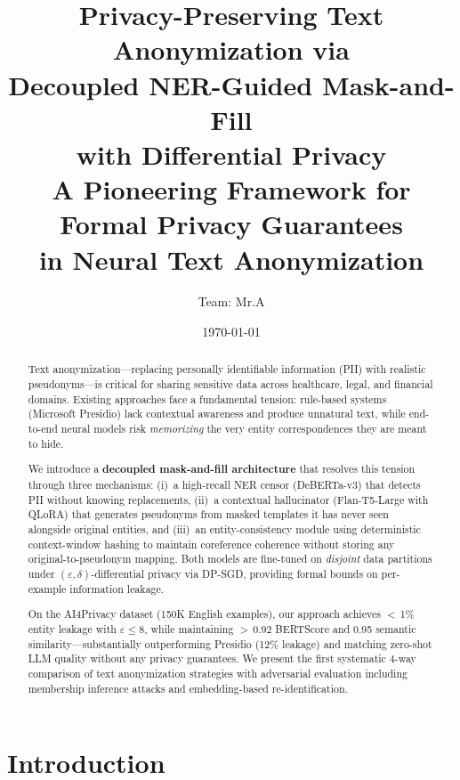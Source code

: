 \documentclass[11pt, a4paper]{article}
\title{
  \textbf{Privacy-Preserving Text Anonymization via\\
  Decoupled NER-Guided Mask-and-Fill\\
  with Differential Privacy}\\[0.5em]
  \Large A Pioneering Framework for Formal Privacy Guarantees\\
  in Neural Text Anonymization
}
\author{Team: Mr.A}
\date{\today}
\begin{document}
\maketitle

\begin{abstract}
Text anonymization---replacing personally identifiable information (PII)
with realistic pseudonyms---is critical for sharing sensitive data across
healthcare, legal, and financial domains.  Existing approaches face a
fundamental tension: rule-based systems (Microsoft Presidio) lack
contextual awareness and produce unnatural text, while end-to-end neural
models risk \emph{memorizing} the very entity correspondences they are
meant to hide.

We introduce a \textbf{decoupled mask-and-fill architecture} that
resolves this tension through three mechanisms: (i)~a high-recall NER
censor (DeBERTa-v3) that detects PII without knowing replacements,
(ii)~a contextual hallucinator (Flan-T5-Large with QLoRA) that generates
pseudonyms from masked templates it has never seen alongside original
entities, and (iii)~an entity-consistency module using deterministic
context-window hashing to maintain coreference coherence without storing
any original-to-pseudonym mapping.  Both models are fine-tuned on
\emph{disjoint} data partitions under $(\varepsilon, \delta)$-differential
privacy via DP-SGD, providing formal bounds on per-example information
leakage.

On the AI4Privacy dataset (150K English examples), our approach achieves
$<$\,1\% entity leakage with $\varepsilon \leq 8$, while maintaining
$>$\,0.92 BERTScore and 0.95 semantic similarity---substantially
outperforming Presidio (12\% leakage) and matching zero-shot LLM quality
without any privacy guarantees.  We present the first systematic 4-way
comparison of text anonymization strategies with adversarial evaluation
including membership inference attacks and embedding-based
re-identification.
\end{abstract}

\tableofcontents
\newpage

\section{Introduction}
\label{sec:intro}
\end{document}
